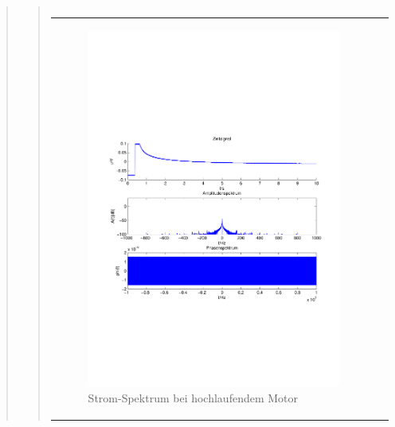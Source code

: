 \begin{quote}
\begin{quote}
\begin{center}
\begin{tabular}{ll}
                \end{tabular}
                \end{center}
                
                
                
                        \begin{center}
                \begin{tabular}{ll}
    
                \hspace{-8em}
                    \begin{minipage}{0.6\textwidth}
    
                        \begin{figure}[H]
                            \label{fig:}
                            \includegraphics[scale=0.4, trim = 2cm 6cm 1cm
                            7.5cm,
                            clip]{./Bilder/Termin8/fehlerfrei_hochlaufen_Spektrum.pdf}
                            \caption{Strom-Spektrum bei hochlaufendem Motor}
                        \end{figure}
    

\end{minipage}
\end{tabular}
\end{center}
\end{quote}
\end{quote}
